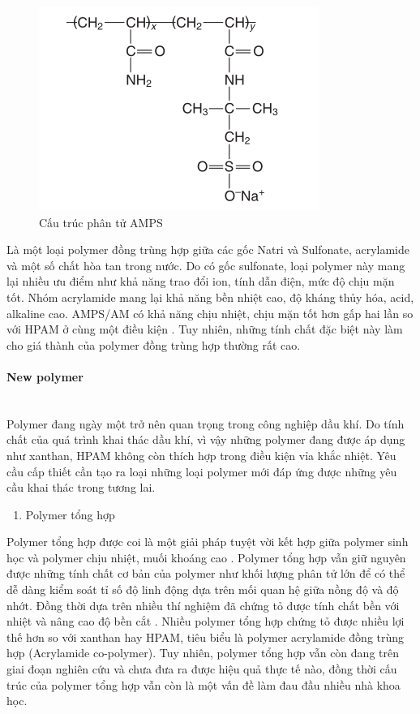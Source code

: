 \documentclass[12pt,a4paper]{article}
\newcommand{\subsubsubsection}[1]{\paragraph{#1}\mbox{}\\}
\begin{document}
	\begin{figure}[h]
		\centering
		\includegraphics[scale=0.7]{Fig/AMPS.PNG}
		\caption{Cấu trúc phân tử AMPS \cite{sheng2010modern}}
	\end{figure}
	\newline
	Là một loại polymer đồng trùng hợp giữa các gốc Natri và Sulfonate, acrylamide và một số chất hòa tan trong nước. Do có gốc sulfonate, loại polymer này mang lại nhiều ưu điểm như khả năng trao đổi ion, tính dẫn điện, mức độ chịu mặn tốt. Nhóm acrylamide mang lại khả năng bền nhiệt cao, độ kháng thủy hóa, acid, alkaline cao. AMPS/AM có khả năng chịu nhiệt, chịu mặn tốt hơn gấp hai lần so với HPAM ở cùng một điều kiện \cite{sheng2010modern}. Tuy nhiên, những tính chất đặc biệt này làm cho giá thành của polymer đồng trùng hợp thường rất cao.
	\subsubsubsection{New polymer}
	Polymer đang ngày một trở nên quan trọng trong công nghiệp dầu khí. Do tính chất của quá trình khai thác dầu khí, vì vậy những polymer đang được áp dụng như xanthan, HPAM không còn thích hợp trong điều kiện vỉa khắc nhiệt. Yêu cầu cấp thiết cần tạo ra loại những loại polymer mới đáp ứng được những yêu cầu khai thác trong tương lai. 	
		\begin{enumerate}
			\item Polymer tổng hợp
		\end{enumerate}
	Polymer tổng hợp được coi là một giải pháp tuyệt vời kết hợp giữa polymer sinh học và polymer chịu nhiệt, muối khoáng cao \cite{sorbie2013polymer}. Polymer tổng hợp vẫn giữ nguyên được những tính chất cơ bản của polymer như khối lượng phân tử lớn để có thể dễ dàng kiểm soát tỉ số độ linh động dựa trên mối quan hệ giữa nồng độ và độ nhớt. Đồng thời dựa trên nhiều thí nghiệm đã chứng tỏ được tính chất bền với nhiệt và nâng cao độ bền cắt \cite{sorbie2013polymer}. Nhiều polymer tổng hợp chứng tỏ được nhiều lợi thế hơn so với xanthan hay HPAM, tiêu biểu là polymer acrylamide đồng trùng hợp (Acrylamide co-polymer). Tuy nhiên, polymer tổng hợp vẫn còn đang trên giai đoạn nghiên cứu và chưa đưa ra được hiệu quả thực tế nào, đồng thời cấu trúc của polymer tổng hợp vẫn còn là một vấn đề làm đau đầu nhiều nhà khoa học. 
\end{document}
